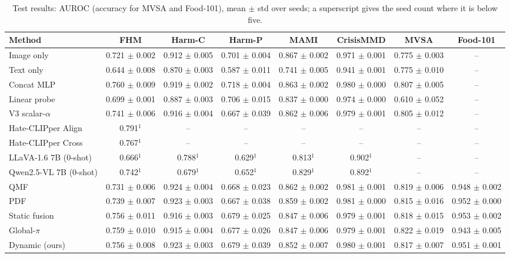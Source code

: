 \begin{table}[t]
\centering
\caption{Test results: AUROC (accuracy for MVSA and Food-101), mean $\pm$ std over seeds; a superscript gives the seed count where it is below five.}
\label{tab:main}
\begin{tabular}{lccccccc}
\toprule
Method & FHM & Harm-C & Harm-P & MAMI & CrisisMMD & MVSA & Food-101 \\
\midrule
Image only & 0.721 $\pm$ 0.002 & 0.912 $\pm$ 0.005 & 0.701 $\pm$ 0.004 & 0.867 $\pm$ 0.002 & 0.971 $\pm$ 0.001 & 0.775 $\pm$ 0.003 & – \\
Text only & 0.644 $\pm$ 0.008 & 0.870 $\pm$ 0.003 & 0.587 $\pm$ 0.011 & 0.741 $\pm$ 0.005 & 0.941 $\pm$ 0.001 & 0.775 $\pm$ 0.010 & – \\
Concat MLP & 0.760 $\pm$ 0.009 & 0.919 $\pm$ 0.002 & 0.718 $\pm$ 0.004 & 0.863 $\pm$ 0.002 & 0.980 $\pm$ 0.000 & 0.807 $\pm$ 0.005 & – \\
Linear probe & 0.699 $\pm$ 0.001 & 0.887 $\pm$ 0.003 & 0.706 $\pm$ 0.015 & 0.837 $\pm$ 0.000 & 0.974 $\pm$ 0.000 & 0.610 $\pm$ 0.052 & – \\
V3 scalar-$\alpha$ & 0.741 $\pm$ 0.006 & 0.916 $\pm$ 0.004 & 0.667 $\pm$ 0.039 & 0.862 $\pm$ 0.006 & 0.979 $\pm$ 0.001 & 0.805 $\pm$ 0.012 & – \\
Hate-CLIPper Align & 0.791$^{1}$ & – & – & – & – & – & – \\
Hate-CLIPper Cross & 0.767$^{1}$ & – & – & – & – & – & – \\
LLaVA-1.6 7B (0-shot) & 0.666$^{1}$ & 0.788$^{1}$ & 0.629$^{1}$ & 0.813$^{1}$ & 0.902$^{1}$ & – & – \\
Qwen2.5-VL 7B (0-shot) & 0.742$^{1}$ & 0.679$^{1}$ & 0.652$^{1}$ & 0.829$^{1}$ & 0.892$^{1}$ & – & – \\
QMF & 0.731 $\pm$ 0.006 & 0.924 $\pm$ 0.004 & 0.668 $\pm$ 0.023 & 0.862 $\pm$ 0.002 & 0.981 $\pm$ 0.001 & 0.819 $\pm$ 0.006 & 0.948 $\pm$ 0.002 \\
PDF & 0.739 $\pm$ 0.007 & 0.923 $\pm$ 0.003 & 0.667 $\pm$ 0.038 & 0.859 $\pm$ 0.002 & 0.981 $\pm$ 0.000 & 0.815 $\pm$ 0.016 & 0.952 $\pm$ 0.000 \\
Static fusion & 0.756 $\pm$ 0.011 & 0.916 $\pm$ 0.003 & 0.679 $\pm$ 0.025 & 0.847 $\pm$ 0.006 & 0.979 $\pm$ 0.001 & 0.818 $\pm$ 0.015 & 0.953 $\pm$ 0.002 \\
Global-$\pi$ & 0.759 $\pm$ 0.010 & 0.915 $\pm$ 0.004 & 0.677 $\pm$ 0.026 & 0.847 $\pm$ 0.006 & 0.979 $\pm$ 0.001 & 0.822 $\pm$ 0.019 & 0.943 $\pm$ 0.005 \\
Dynamic (ours) & 0.756 $\pm$ 0.008 & 0.923 $\pm$ 0.003 & 0.679 $\pm$ 0.039 & 0.852 $\pm$ 0.007 & 0.980 $\pm$ 0.001 & 0.817 $\pm$ 0.007 & 0.951 $\pm$ 0.001 \\
\bottomrule
\end{tabular}
\end{table}
